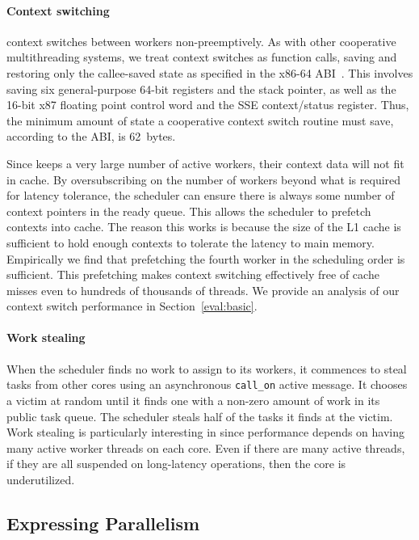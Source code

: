 \paragraph{Context switching} 
\Grappa context switches between workers non-preemptively. As with other
cooperative multithreading systems, we treat context switches as function
calls, saving and restoring only the callee-saved state as specified in the
x86-64 ABI~\cite{amd64:abi:2012}. This involves saving six general-purpose
64-bit registers and the stack pointer, as well as the 16-bit x87 floating
point control word and the SSE context/status register. Thus, the minimum
amount of state a cooperative context switch routine must save, according to
the ABI, is 62~bytes.

Since \Grappa keeps a very large number of active workers, their context data
will not fit in cache. By oversubscribing on the number of workers
beyond what is required for latency tolerance, the scheduler can
ensure there is always some number of context pointers in the ready
queue. This allows the scheduler to prefetch contexts into
cache. The reason this works is because the size of the L1 cache is
sufficient to hold enough contexts to tolerate the latency to main
memory. Empirically we find that prefetching the fourth worker in the scheduling order is
sufficient. This prefetching makes context switching effectively free of cache misses even to hundreds
of thousands of threads. We provide an analysis of our context switch
performance in Section~\ref{eval:basic}.

\paragraph{Work stealing} 
When the scheduler finds no work to assign to its workers, it commences to
steal tasks from other cores using an asynchronous \texttt{call\_on} active
message. It chooses a victim at random until it finds one with a non-zero
amount of work in its public task queue. The scheduler steals half of the
tasks it finds at the victim. Work stealing is particularly interesting in
\Grappa since performance depends on having many active worker threads on each
core. Even if there are many active threads, if they are all suspended on
long-latency operations, then the core is underutilized.

\subsection{Expressing Parallelism}

